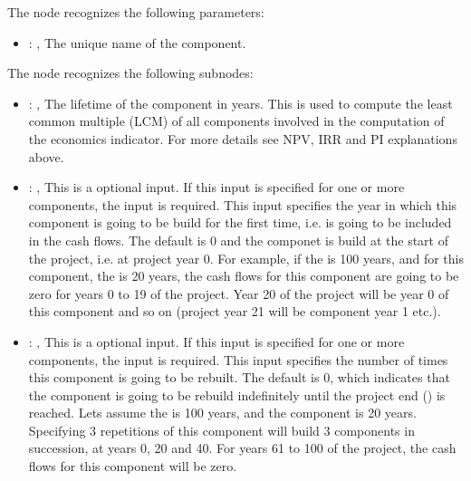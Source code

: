   The  node recognizes the following parameters:
    \begin{itemize}
      \item {}: , 
        The unique name of the component.
  \end{itemize}

  The  node recognizes the following subnodes:
  \begin{itemize}
    \item {}: , 
      The lifetime of the component in years. This is used to compute the least common multiple
      (LCM) of all components involved in the                                 computation of the
      economics indicator. For more details see NPV, IRR and PI explanations above.

    \item {}: , 
      This is a optional input. If this input is specified for one or more components, the
                                       input  is required. This
      input specifies the year in which this component is going to be build for the first time,
      i.e. is going to be included in the cash flows. The default is 0 and the componet is build at
      the start of the project, i.e. at project year 0.                                 For example,
      if the  is 100 years, and for this component, the  is
      20 years, the cash flows for this                                 component are going to be
      zero for years 0 to 19 of the project. Year 20 of the project will be year 0 of this component
      and so on                                 (project year 21 will be component year 1 etc.).

    \item {}: , 
      This is a optional input. If this input is specified for one or more components, the
                                       input  is required. This
      input specifies the number of times this component is going to be rebuilt. The default is 0,
      which indicates that the component is going to be rebuild indefinitely until the project end
      () is reached.                                 Lets assume the
       is 100 years, and the component  is 20 years.
      Specifying 3 repetitions of this                                 component will build 3
      components in succession, at years 0, 20 and 40. For years 61 to 100 of the project, the cash
      flows for this component will be zero.


\end{itemize}
